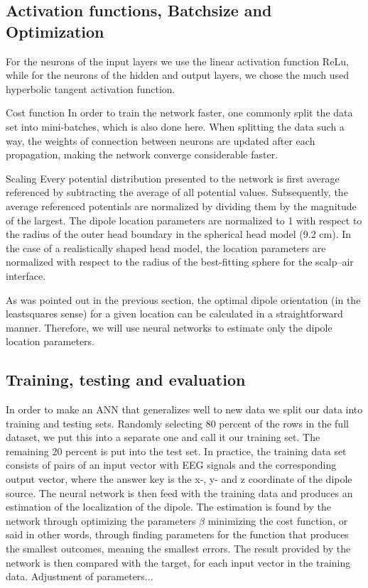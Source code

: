 \documentclass[a4paper, UKenglish, 11pt]{uiomaster}
\begin{document}
\subsection{Activation functions, Batchsize and Optimization}
For the neurons of the input layers we use the linear activation function ReLu, while for the neurons of the hidden and output layers, we chose the much used hyperbolic tangent activation function.

Cost function
In order to train the network faster, one commonly split the data set into mini-batches, which is also done here. When splitting the data such a way, the weights of connection between neurons are updated after each propagation, making the network converge considerable faster.

Scaling
Every potential distribution presented to the network is first average referenced by subtracting the average of all potential values. Subsequently, the average referenced potentials are normalized by dividing them by the magnitude of the largest. The dipole location parameters are normalized to 1 with respect to the radius of the outer head boundary in the spherical head model (9.2 cm). In the case of a realistically shaped head model, the location parameters are normalized with respect to the radius of the best-fitting sphere for the scalp–air interface.

As was pointed out in the previous section, the optimal dipole orientation (in the leastsquares sense) for a given location can be calculated in a straightforward manner. Therefore, we will use neural networks to estimate only the dipole location parameters.


\subsection{Training, testing and evaluation}
In order to make an ANN that generalizes well to new data we split our data into training and testing sets. Randomly selecting 80 percent of the rows in the full dataset, we put this into a separate one and call it our training set. The remaining 20 percent is put into the test set. In practice, the training data set consists of pairs of an input vector with EEG signals and the corresponding output vector, where the answer key is the x-, y- and z coordinate of the dipole source. The neural network is then feed with the training data and produces an estimation of the localization of the dipole. The estimation is found by the network through optimizing the parameters $\beta$ minimizing the cost function, or said in other words, through finding parameters for the function that produces the smallest outcomes, meaning the smallest errors. The result provided by the network is then compared with the target, for each input vector in the training data. Adjustment of parameters...
\end{document}
